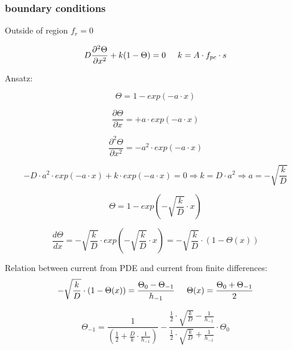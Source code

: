 \subsubsection{boundary conditions}
Outside of region $f_r = 0$

\begin{equation}
D\frac{\partial^2 \Theta}{\partial x^2} + k(1-\Theta) = 0 \hspace{0.5cm} k = A\cdot f_{pc} \cdot s
\end{equation}

Ansatz:

\begin{equation}
\Theta = 1 - exp(-a\cdot x)
\end{equation}

\begin{equation}
\frac{\partial\Theta}{\partial x} = +a\cdot exp(-a\cdot x)
\end{equation}

\begin{equation}
\frac{\partial^2\Theta}{\partial x^2} = -a^2\cdot exp(-a\cdot x)
\end{equation}

\begin{equation}
-D\cdot a^2 \cdot exp(-a \cdot x) + k\cdot exp(-a \cdot x) = 0 \Rightarrow k = D\cdot a^2 \Rightarrow a = -\sqrt{\frac{k}{D}}
\end{equation}

\begin{equation}
\Theta = 1 - exp(-\sqrt{\frac{k}{D}}\cdot x)
\end{equation}

\begin{equation}
\frac{d\Theta}{dx} = - \sqrt{\frac{k}{D}}\cdot exp(-\sqrt{\frac{k}{D}}\cdot x) = -\sqrt{\frac{k}{D}}\cdot (1-\Theta(x))
\end{equation}

Relation between current from PDE and current from finite differences:
\begin{equation}
-\sqrt{\frac{k}{D}}\cdot (1-\Theta(x)) = \frac{\Theta_0 - \Theta_{-1}}{h_{-1}} \hspace{0.5cm}\Theta(x) =  \frac{\Theta_0 + \Theta_{-1}}{2}
\end{equation}

\begin{equation}
\Theta_{-1} = \frac{1}{(\frac{1}{2}+\frac{D}{k}\cdot \frac{1}{h_{-1}})} - \frac{\frac{1}{2}\cdot \sqrt{\frac{k}{D}} - \frac{1}{h_{-1}}}{\frac{1}{2}\cdot \sqrt{\frac{k}{D}} + \frac{1}{h_{-1}}}\cdot \Theta_0
\end{equation}

